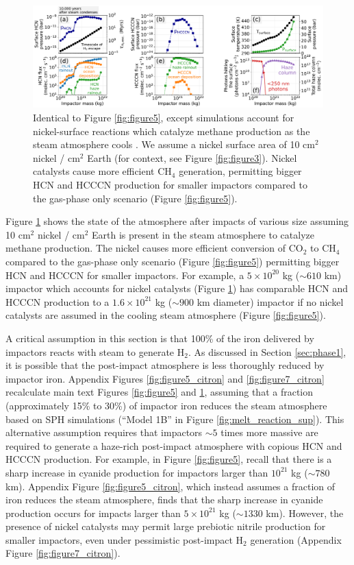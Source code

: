 \begin{figure}
  \centering
  \includegraphics[width=1.0\textwidth]{tex/5impacts/figures/Figure7.pdf}
  \caption{Identical to Figure \ref{fig:figure5}, except simulations account for nickel-surface reactions which catalyze methane production as the steam atmosphere cools \citep{Schmider_2021}. We assume a nickel surface area of 10 cm$^2$ nickel / cm$^2$ Earth (for context, see Figure \ref{fig:figure3}). Nickel catalysts cause more efficient CH$_4$ generation, permitting bigger HCN and HCCCN production for smaller impactors compared to the gas-phase only scenario (Figure \ref{fig:figure5}).}
  \label{fig:figure7}
\end{figure}

Figure \ref{fig:figure7} shows the state of the atmosphere after impacts of various size assuming 10 cm$^2$ nickel / cm$^2$ Earth is present in the steam atmosphere to catalyze methane production. The nickel causes more efficient conversion of CO$_2$ to CH$_4$ compared to the gas-phase only scenario (Figure \ref{fig:figure5}) permitting bigger HCN and HCCCN for smaller impactors. For example, a $5 \times 10^{20}$ kg ($\sim 610$ km) impactor which accounts for nickel catalysts (Figure \ref{fig:figure7}) has comparable HCN and HCCCN production to a $1.6 \times 10^{21}$ kg ($\sim 900$ km diameter) impactor if no nickel catalysts are assumed in the cooling steam atmosphere (Figure \ref{fig:figure5}).

A critical assumption in this section is that 100\% of the iron delivered by impactors reacts with steam to generate H$_2$. As discussed in Section \ref{sec:phase1}, it is possible that the post-impact atmosphere is less thoroughly reduced by impactor iron. Appendix Figures \ref{fig:figure5_citron} and \ref{fig:figure7_citron} recalculate main text Figures \ref{fig:figure5} and \ref{fig:figure7}, assuming that a fraction (approximately 15\% to 30\%) of impactor iron reduces the steam atmosphere based on SPH simulations (``Model 1B'' in Figure \ref{fig:melt_reaction_sup}). This alternative assumption requires that impactors $\sim 5$ times more massive are required to generate a haze-rich post-impact atmosphere with copious HCN and HCCCN production. For example, in Figure \ref{fig:figure5}, recall that there is a sharp increase in cyanide production for impactors larger than $10^{21}$ kg ($\sim 780$ km). Appendix Figure \ref{fig:figure5_citron}, which instead assumes a fraction of iron reduces the steam atmosphere, finds that the sharp increase in cyanide production occurs for impacts larger than $5 \times 10^{21}$ kg ($\sim 1330$ km). However, the presence of nickel catalysts may permit large prebiotic nitrile production for smaller impactors, even under pessimistic post-impact H$_2$ generation (Appendix Figure \ref{fig:figure7_citron}).

